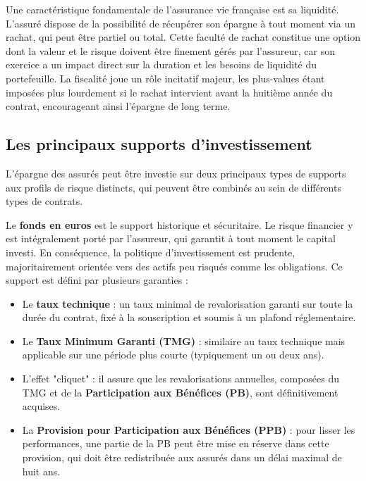 \bigskip

Une caractéristique fondamentale de l'assurance vie française est sa liquidité. L'assuré dispose de la possibilité de récupérer son épargne à tout moment via un rachat, qui peut être partiel ou total. Cette faculté de rachat constitue une option dont la valeur et le risque doivent être finement gérés par l'assureur, car son exercice a un impact direct sur la duration et les besoins de liquidité du portefeuille. La fiscalité joue un rôle incitatif majeur, les plus-values étant imposées plus lourdement si le rachat intervient avant la huitième année du contrat, encourageant ainsi l'épargne de long terme.

\subsection{Les principaux supports d'investissement}

L'épargne des assurés peut être investie sur deux principaux types de supports aux profils de risque distincts, qui peuvent être combinés au sein de différents types de contrats.

\bigskip


Le \textbf{fonds en euros} est le support historique et sécuritaire. Le risque financier y est intégralement porté par l'assureur, qui garantit à tout moment le capital investi. En conséquence, la politique d'investissement est prudente, majoritairement orientée vers des actifs peu risqués comme les obligations. Ce support est défini par plusieurs garanties :
\begin{itemize}
    \item Le \textbf{taux technique} : un taux minimal de revalorisation garanti sur toute la durée du contrat, fixé à la souscription et soumis à un plafond réglementaire.
    \item Le \textbf{Taux Minimum Garanti (TMG)} : similaire au taux technique mais applicable sur une période plus courte (typiquement un ou deux ans).
    \item L'effet "cliquet" : il assure que les revalorisations annuelles, composées du TMG et de la \textbf{Participation aux Bénéfices (PB)}, sont définitivement acquises.
    \item La \textbf{Provision pour Participation aux Bénéfices (PPB)} : pour lisser les performances, une partie de la PB peut être mise en réserve dans cette provision, qui doit être redistribuée aux assurés dans un délai maximal de huit ans.
\end{itemize}


